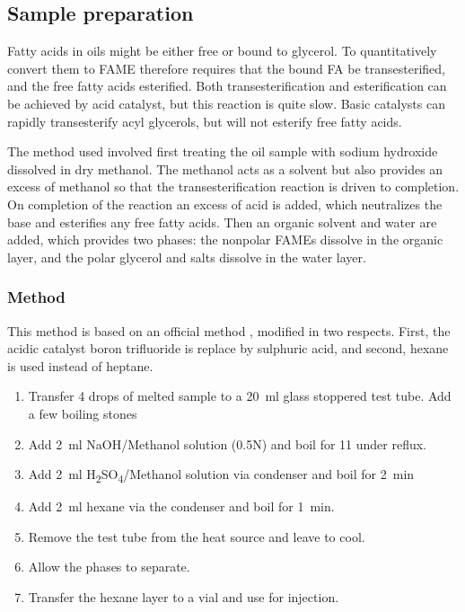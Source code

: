 \subsection{Sample preparation}

Fatty acids in oils might be either free or bound to glycerol. To quantitatively
convert them to FAME therefore requires that the bound FA be transesterified,
and the free fatty acids esterified. Both transesterification and esterification
can be achieved by acid catalyst, but this reaction is quite slow. Basic
catalysts can rapidly transesterify acyl glycerols, but will not esterify free
fatty acids.

The method used involved first treating the oil sample with sodium hydroxide
dissolved in dry methanol. The methanol acts as a solvent but also provides an
excess of methanol so that the transesterification reaction is driven to
completion. On completion of the reaction an excess of acid is added, which
neutralizes the base and esterifies any free fatty acids. Then an organic
solvent and water are added, which provides two phases: the nonpolar FAMEs
dissolve in the organic layer, and the polar glycerol and salts dissolve in the
water layer.

\subsubsection{Method}

This method is based on an official method \autocite{AOCS2017}, modified in two
respects. First, the acidic catalyst boron trifluoride is replace by sulphuric
acid, and second, hexane is used instead of heptane.

\begin{enumerate}
  
\item Transfer \num{4} drops of melted sample to a \SI{20}{\milli\litre} glass
stoppered test tube. Add a few boiling stones

\item Add \SI{2}{\milli\litre} NaOH/Methanol solution (0.5N) and boil for
\SI{11}{\min} under reflux.

\item Add \SI{2}{\milli\litre} H\textsubscript{2}SO\textsubscript{4}/Methanol
solution via condenser and boil for \SI{2}{\minute}

\item  Add \SI{2}{\milli\litre} hexane via the condenser and boil for
\SI{1}{\minute}.

\item Remove the test tube from the heat source and leave to cool.

\item Allow the phases to separate.

\item Transfer the hexane layer to a vial and use for injection.

\end{enumerate}


